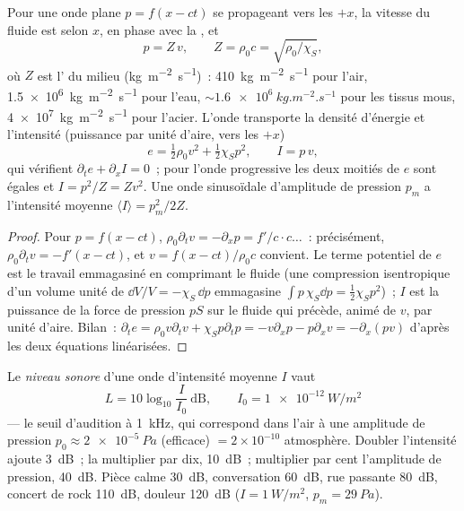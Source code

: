 \begin{proposition}\label{prop:b2:sound-waves:plane}
Pour une onde plane $p = f(x - ct)$ se propageant vers les $+x$, la vitesse du
fluide est selon $x$, en phase avec la , et
\[
p = Z\,v , \qquad Z = \rho_0c = \sqrt{\rho_0/\chi_S} ,
\]
où $Z$ est l'\emph{} du milieu
(\unit{kg.m^{-2}.s^{-1}})~: \qty{410}{kg.m^{-2}.s^{-1}} pour l'air, \qty{1.5e6}{kg.m^{-2}.s^{-1}}
pour l'eau, $\sim\qty{1.6e6}{kg.m^{-2}.s^{-1}}$ pour les tissus mous,
\qty{4e7}{kg.m^{-2}.s^{-1}} pour l'acier. L'onde transporte la densité d'énergie et
l'intensité (puissance par unité d'aire, vers les $+x$)
\[
e = \tfrac12\rho_0v^2 + \tfrac12\chi_Sp^2 , \qquad I = p\,v ,
\]
qui vérifient $\partial_te + \partial_xI = 0$~; pour l'onde progressive les deux
moitiés de $e$ sont égales et $I = p^2/Z = Zv^2$. Une onde sinusoïdale
d'amplitude de pression $p_m$ a l'intensité moyenne $\langle I\rangle = p_m^2/2Z$.
\end{proposition}

\begin{proof}
Pour $p = f(x - ct)$, $\rho_0\partial_tv = -\partial_xp = f'/c\cdot c\dots$~: précisément,
$\rho_0\partial_tv = -f'(x - ct)$, et $v = f(x - ct)/\rho_0c$ convient. Le
terme potentiel de $e$ est le travail emmagasiné en comprimant le fluide
(une compression isentropique d'un volume unité de $\dd V/V = -\chi_S\,\dd p$
emmagasine $\int p\,\chi_S\dd p = \tfrac12\chi_Sp^2$)~; $I$ est la puissance de la
force de pression $pS$ sur le fluide qui précède, animé de $v$, par unité d'aire.
Bilan~: $\partial_te = \rho_0v\partial_tv + \chi_Sp\partial_tp = -v\partial_xp - p\partial_xv =
-\partial_x(pv)$ d'après les deux équations linéarisées.
\end{proof}

\begin{definition}\label{def:b2:sound-waves:decibel}
Le \emph{niveau sonore} d'une onde d'intensité moyenne $I$ vaut
\[
L = 10\log_{10}\frac I{I_0} \ \text{dB} , \qquad I_0 = \qty{1e-12}{W/m^2}
\]
--- le seuil d'audition à \qty{1}{kHz}, qui correspond dans l'air à une
amplitude de pression $p_0 \approx \qty{2e-5}{Pa}$ (efficace) $= 2 \times 10^{-10}$
atmosphère. Doubler l'intensité ajoute \qty{3}{dB}~; la multiplier par dix, \qty{10}{dB}~;
multiplier par cent l'amplitude de pression, \qty{40}{dB}. Pièce calme
\qty{30}{dB}, conversation \qty{60}{dB}, rue passante \qty{80}{dB}, concert de rock
\qty{110}{dB}, douleur \qty{120}{dB} ($I = \qty{1}{W/m^2}$, $p_m = \qty{29}{Pa}$).
\end{definition}

